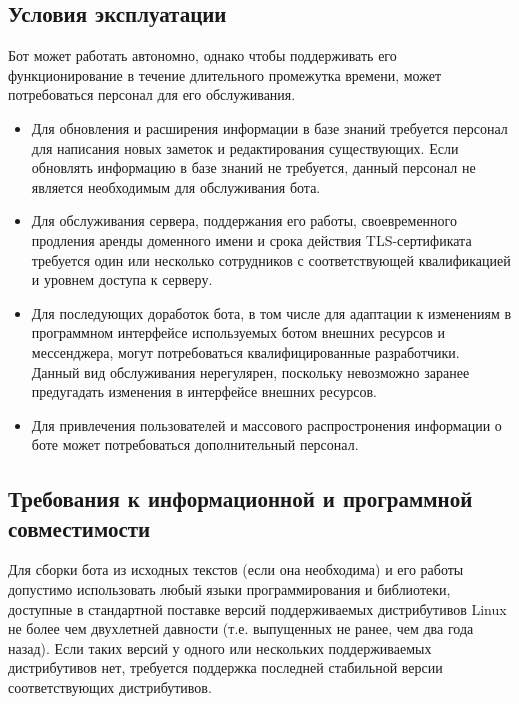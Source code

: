 \subsection{Условия эксплуатации}
    \label{sec:req:maint}
    Бот может работать автономно, однако чтобы поддерживать его функционирование в течение
    длительного промежутка времени, может потребоваться персонал для его обслуживания.

    \begin{itemize}
        \item
            Для обновления и расширения информации в базе знаний требуется персонал для
            написания новых заметок и редактирования существующих. Если обновлять информацию
            в базе знаний не требуется, данный персонал не является необходимым для обслуживания бота.
        \item
            Для обслуживания сервера, поддержания его работы, своевременного продления аренды доменного имени
            и срока действия TLS-сертификата требуется один или несколько сотрудников с соответствующей
            квалификацией и уровнем доступа к серверу.
        \item
            Для последующих доработок бота, в том числе для адаптации к изменениям в программном интерфейсе
            используемых ботом внешних ресурсов и мессенджера, могут потребоваться квалифицированные
            разработчики. Данный вид обслуживания нерегулярен, поскольку невозможно заранее предугадать
            изменения в интерфейсе внешних ресурсов.
        \item
            Для привлечения пользователей и массового распростронения информации о боте может
            потребоваться дополнительный персонал.
    \end{itemize}

\subsection{Требования к информационной и программной совместимости}
    \label{sec:req:compat}
    Для сборки бота из исходных текстов (если она необходима) и его работы допустимо использовать
    любый языки программирования и библиотеки, доступные в стандартной поставке версий поддерживаемых
    дистрибутивов Linux не более чем двухлетней давности (т.е. выпущенных не ранее, чем два
    года назад). Если таких версий у одного или нескольких поддерживаемых дистрибутивов нет,
    требуется поддержка последней стабильной версии соответствующих дистрибутивов.
